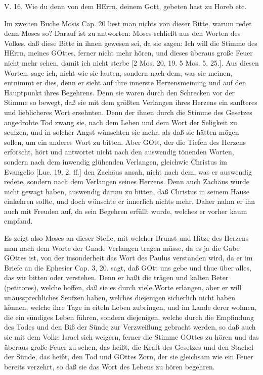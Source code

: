 \begin{schriftzitat}
V. 16. Wie du denn von dem HErrn, deinem Gott, gebeten hast zu Horeb etc.
\end{schriftzitat}

Im zweiten Buche Mosis Cap. 20 liest man nichts von dieser Bitte, warum redet denn Moses so? Darauf ist zu antworten: Moses schließt aus den Worten des Volkes, daß diese Bitte in ihnen gewesen sei, da sie sagen: Ich will die Stimme des HErrn, meines GOttes, ferner nicht mehr hören, und dieses überaus große Feuer nicht mehr sehen, damit ich nicht sterbe [2 Mos. 20, 19. 5 Mos. 5, 25.]. Aus diesen Worten, sage ich, nicht wie sie lauten, sondern nach dem, was sie meinen, entnimmt er dies, denn er sieht auf ihre innerste Herzensmeinung und auf den Hauptpunkt ihres Begehrens. Denn sie waren durch den Schrecken vor der Stimme so bewegt, daß sie mit dem größten Verlangen ihres Herzens ein sanfteres und lieblicheres Wort ersehnten. Denn der ihnen durch die Stimme des Gesetzes angedrohte Tod zwang sie, nach dem Leben und dem Wort der Seligkeit zu seufzen, und in solcher Angst wünschten sie mehr, als daß sie hätten mögen sollen, um ein anderes Wort zu bitten. Aber GOtt, der die Tiefen des Herzens erforscht, hört und antwortet nicht nach den auswendig tönenden Worten, sondern nach dem inwendig glühenden Verlangen, gleichwie Christus im Evangelio [Luc. 19, 2. ff.] den Zachäus ansah, nicht nach dem, was er auswendig redete, sondern nach dem Verlangen seines Herzens. Denn auch Zachäus würde nicht gewagt haben, auswendig darum zu bitten, daß
Christus in seinem Hause einkehren sollte, und doch wünschte er innerlich nichts mehr. Daher nahm er ihn auch mit Freuden auf, da sein Begehren erfüllt wurde, welches er vorher kaum empfand.

Es zeigt also Moses an dieser Stelle, mit welcher Brunst und Hitze des Herzens man nach dem Worte der Gnade Verlangen tragen müsse, da es ja die Gabe GOttes ist, von der insonderheit das Wort des Paulus verstanden wird, da er im Briefe an die Ephesier Cap. 3, 20. sagt, daß GOtt uns gebe und thue über alles, das wir bitten oder verstehen. Denn er haßt die trägen und kalten Beter (petitores), welche hoffen, daß sie es durch viele Worte erlangen, aber er will unaussprechliches Seufzen haben, welches diejenigen sicherlich nicht haben können, welche ihre Tage in eiteln Leben zubringen, und im Lande derer wohnen, die ein sündiges Leben führen, sondern diejenigen, welche durch die Empfindung des Todes und den Biß der Sünde zur Verzweiflung gebracht werden, so daß auch sie mit dem Volke Israel sich weigern, ferner die Stimme GOttes zu hören und das überaus große Feuer zu sehen, das heißt, die Kraft des Gesetzes und den Stachel der Sünde, das heißt, den Tod und GOttes Zorn, der sie gleichsam wie ein Feuer bereits verzehrt, so daß sie das Wort des Lebens zu hören begehren.

